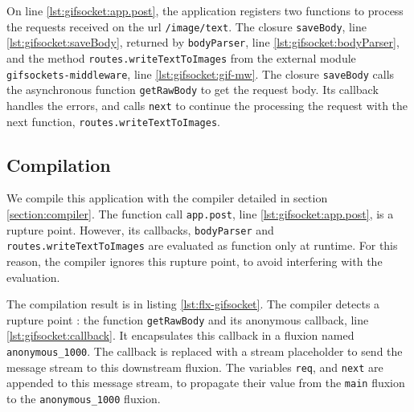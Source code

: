 On line \ref{lst:gifsocket:app.post}, the application registers two functions to process the requests received on the url \texttt{/image/text}.
The closure \texttt{saveBody}, line \ref{lst:gifsocket:saveBody}, returned by \texttt{bodyParser}, line \ref{lst:gifsocket:bodyParser}, and the method \texttt{routes.write\-Text\-To\-Images} from the external module \texttt{gifsockets-middleware}, line \ref{lst:gifsocket:gif-mw}.
The closure \texttt{saveBody} calls the asynchronous function \texttt{getRawBody} to get the request body.
Its callback handles the errors, and calls \texttt{next} to continue the processing the request with the next function, \texttt{routes.write\-Text\-To\-Images}.



\subsection{Compilation}

We compile this application with the compiler detailed in section \ref{section:compiler}.
The function call \texttt{app.post}, line \ref{lst:gifsocket:app.post}, is a rupture point.
However, its callbacks, \texttt{bodyParser} and \texttt{routes.write\-Text\-To\-Images} are evaluated as function only at runtime.
For this reason, the compiler ignores this rupture point, to avoid interfering with the evaluation.

The compilation result is in listing \ref{lst:flx-gifsocket}.
The compiler detects a rupture point : the function \texttt{getRawBody} and its anonymous callback, line \ref{lst:gifsocket:callback}.
It encapsulates this callback in a fluxion named \texttt{anonymous\-\_1000}.
The callback is replaced with a stream placeholder to send the message stream to this downstream fluxion.
The variables \texttt{req}, and \texttt{next} are appended to this message stream, to propagate their value from the \texttt{main} fluxion to the \texttt{anonymous\-\_1000} fluxion.

